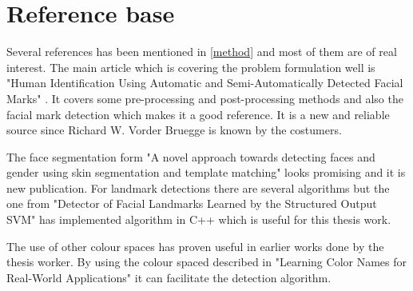 \section{Reference base}

Several references has been mentioned in \cref{method} and most of them are of real interest. The main article which is covering the problem formulation well is "Human Identification Using Automatic and Semi-Automatically Detected Facial Marks" \cite{automatic_detector_2015}. It covers some pre-processing and post-processing methods and also the facial mark detection which makes it a good reference. It is a new and reliable source since Richard W. Vorder Bruegge is known by the costumers. 

The face segmentation form "A novel approach towards detecting faces and gender using skin segmentation and template matching" \cite{face_segmentation_skin} looks promising and it is new publication. For landmark detections there are several algorithms but the one from "Detector of Facial Landmarks Learned by the Structured Output SVM" \cite{landmarks_SVM} has implemented algorithm in C++ which is useful for this thesis work.

The use of other colour spaces has proven useful in earlier works done by the thesis worker. By using the colour spaced described in "Learning Color Names for Real-World Applications" \cite{11_colours} it can facilitate the detection algorithm. 